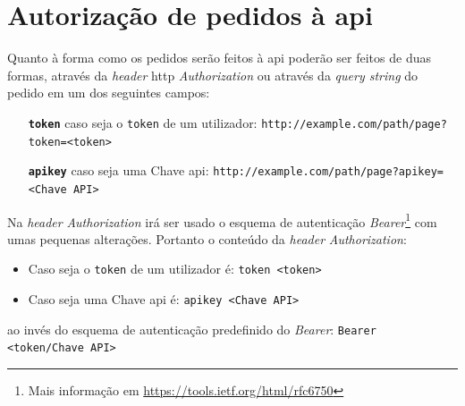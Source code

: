 
\section{Autorização de pedidos à \acrshort{api}}

Quanto à forma como os pedidos serão feitos à \acrshort{api} poderão ser feitos de duas formas, através da \textit{header} \acrshort{http} \textit{Authorization} ou através da \textit{query string} do pedido em um dos seguintes campos:
\begin{itemize}[leftmargin=3cm]
    \item[\textbf{\texttt{token}}] caso seja o \texttt{token} de um utilizador:\newline
        \verb|http://example.com/path/page?token=<token>|
    \item[\textbf{\texttt{apikey}}] caso seja uma Chave \acrshort{api}:\newline
        \verb|http://example.com/path/page?apikey=<Chave API>|
\end{itemize}

Na \textit{header} \textit{Authorization} irá ser usado o esquema de autenticação \textit{Bearer}\footnote{Mais informação em \url{https://tools.ietf.org/html/rfc6750}} com umas pequenas alterações. Portanto o conteúdo da \textit{header} \textit{Authorization}:
\begin{itemize}[leftmargin=2cm]
    \item Caso seja o \texttt{token} de um utilizador é:\newline
        \verb|token <token>|
    \item Caso seja uma Chave \acrshort{api} é:\newline
        \verb|apikey <Chave API>|
\end{itemize}
ao invés do esquema de autenticação predefinido do \textit{Bearer}: \verb|Bearer <token/Chave API>|

